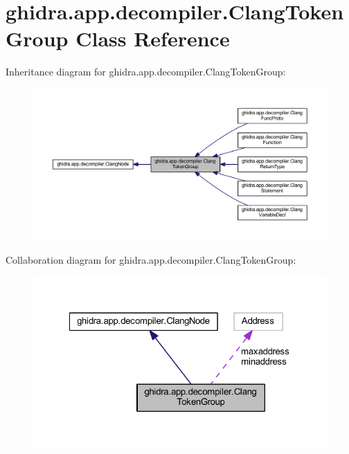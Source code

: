 \hypertarget{classghidra_1_1app_1_1decompiler_1_1_clang_token_group}{}\section{ghidra.\+app.\+decompiler.\+Clang\+Token\+Group Class Reference}
\label{classghidra_1_1app_1_1decompiler_1_1_clang_token_group}


Inheritance diagram for ghidra.\+app.\+decompiler.\+Clang\+Token\+Group\+:
\nopagebreak
\begin{figure}[H]
\begin{center}
\leavevmode
\includegraphics[width=350pt]{classghidra_1_1app_1_1decompiler_1_1_clang_token_group__inherit__graph}
\end{center}
\end{figure}


Collaboration diagram for ghidra.\+app.\+decompiler.\+Clang\+Token\+Group\+:
\nopagebreak
\begin{figure}[H]
\begin{center}
\leavevmode
\includegraphics[width=322pt]{classghidra_1_1app_1_1decompiler_1_1_clang_token_group__coll__graph}
\end{center}
\end{figure}
